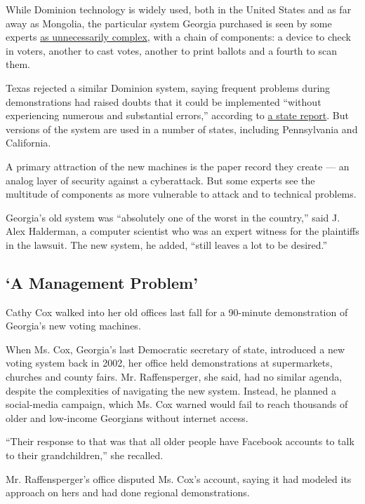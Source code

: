 While Dominion technology is widely used, both in the United States and
as far away as Mongolia, the particular system Georgia purchased is seen
by some experts
\href{https://qz.com/1661870/georgias-new-voting-tech-raises-questions-over-election-security/}{as
unnecessarily complex}, with a chain of components: a device to check in
voters, another to cast votes, another to print ballots and a fourth to
scan them.

Texas rejected a similar Dominion system, saying frequent problems
during demonstrations had raised doubts that it could be implemented
``without experiencing numerous and substantial errors,'' according to
\href{https://voterga.files.wordpress.com/2019/08/texas-sos-rejection-of-dominion.pdf}{a
state report}. But versions of the system are used in a number of
states, including Pennsylvania and California.

A primary attraction of the new machines is the paper record they create
--- an analog layer of security against a cyberattack. But some experts
see the multitude of components as more vulnerable to attack and to
technical problems.

Georgia's old system was ``absolutely one of the worst in the country,''
said J. Alex Halderman, a computer scientist who was an expert witness
for the plaintiffs in the lawsuit. The new system, he added, ``still
leaves a lot to be desired.''

\hypertarget{a-management-problem}{%
\subsection{`A Management Problem'}\label{a-management-problem}}

Cathy Cox walked into her old offices last fall for a 90-minute
demonstration of Georgia's new voting machines.

When Ms. Cox, Georgia's last Democratic secretary of state, introduced a
new voting system back in 2002, her office held demonstrations at
supermarkets, churches and county fairs. Mr. Raffensperger, she said,
had no similar agenda, despite the complexities of navigating the new
system. Instead, he planned a social-media campaign, which Ms. Cox
warned would fail to reach thousands of older and low-income Georgians
without internet access.

``Their response to that was that all older people have Facebook
accounts to talk to their grandchildren,'' she recalled.

Mr. Raffensperger's office disputed Ms. Cox's account, saying it had
modeled its approach on hers and had done regional demonstrations.

